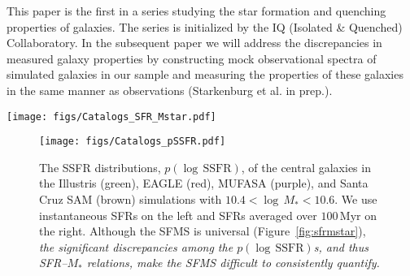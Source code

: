 \documentclass[preprint2,tighten]{aastex62}
\begin{document}
This paper is the first in a series studying the star formation and 
quenching properties of galaxies. The series is initialized by the 
IQ (Isolated \& Quenched) Collaboratory. %
In the subsequent paper we will address the discrepancies in measured 
galaxy properties by constructing mock observational spectra of simulated 
galaxies in our sample and measuring the properties of these galaxies
in the same manner as observations (Starkenburg et al. in prep.).


\begin{figure*}
\begin{center}
\texttt{[image: figs/Catalogs\_SFR\_Mstar.pdf]} 
\caption{The SFR--$M_*$ relations of central galaxies from the Illustris, 
EAGLE, MUFASA, and Santa Cruz SAM simulations (left to right). The 
top panels use instantaneous SFRs while the bottom panels use SFRs 
averaged over $100\,\mathrm{Myr}$. The simulations and how they derive 
the SFRs are described in Section~\ref{sec:galsims}. Although a
direct comparison to observations is tenuous due to the fact that 
the SFRs and $M_*$s of the observed SDSS galaxies are \emph{not} 
derived consistently as simulations, we include, for reference, the 
observed  SDSS galaxies (Section~\ref{sec:obvs}) on the right. 
\emph{The $\mathrm{SFR}--M_*$ relations in every panel reveals a 
clear star forming main sequence.}} 
\label{fig:sfrmstar}
\end{center}
\end{figure*}

\begin{figure}
\begin{center}
\texttt{[image: figs/Catalogs\_pSSFR.pdf]} 
\caption{The SSFR distributions, $p(\log\,\mathrm{SSFR})$, of the 
central galaxies in the Illustris (green), 
EAGLE (red),  MUFASA (purple), and  Santa Cruz SAM (brown) simulations 
with $10.4 < \log\,M_* < 10.6$. We use instantaneous SFRs on the left
and SFRs averaged over $100\,\mathrm{Myr}$ on the right. Although the
SFMS is universal (Figure~\ref{fig:sfrmstar}), 
\emph{the significant discrepancies among the $p(\log\,\mathrm{SSFR})$s,
and thus SFR--$M_*$ relations, make the SFMS difficult to consistently 
quantify.}} \label{fig:pssfr}
\end{center}
\end{figure}
\end{document}
